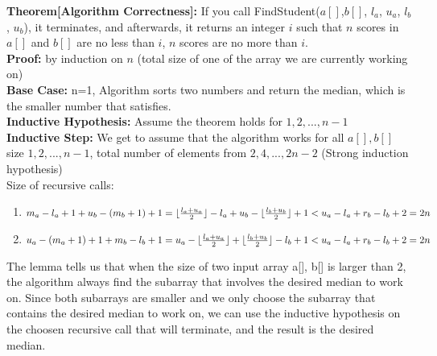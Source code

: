 \documentclass{article}
\begin{document}
\textbf{Theorem[Algorithm Correctness]:} If you call FindStudent($a[ ]$,$b[]$, $l_a$, $u_a$, $l_b$, $u_b$), it terminates, and afterwards, it returns an integer $i$ such that $n$ scores in $a[]$ and $b[]$ are no less than $i$, $n$ scores are no more than $i$.\\
\textbf{Proof:} by induction on $n$ (total size of one of the array we are currently working on)
\\\textbf{Base Case:} n=1, Algorithm sorts two numbers and return the median, which is the smaller number that satisfies.
\\\textbf{Inductive Hypothesis:} Assume the theorem holds for $1,2,...,n-1$
\\\textbf{Inductive Step:} We get to assume that the algorithm works for all $a[],b[]$ size $1,2,...,n-1$, total number of elements from $2,4,...,2n-2$ (Strong induction hypothesis)
\\Size of recursive calls:
\begin{enumerate}
    \item $m_a-l_a+1+u_b-(m_b+1)+1\\= \lfloor\frac{l_a+u_a}{2}\rfloor-l_a+u_b-\lfloor\frac{l_b+u_b}{2}\rfloor+1 < u_a-l_a+r_b-l_b+2=2n$
    \item $u_a-(m_a+1)+1+m_b-l_b+1\\= u_a-\lfloor\frac{l_a+u_a}{2}\rfloor+\lfloor\frac{l_b+u_b}{2}\rfloor-l_b+1 < u_a-l_a+r_b-l_b+2=2n$
\end{enumerate}

The lemma tells us that when the size of two input array a[], b[] is larger than 2, the algorithm always find the subarray that involves the desired median to work on. Since both subarrays are smaller and we only choose the subarray that contains the desired median to work on, we can use the inductive hypothesis on the choosen recursive call that will terminate, and the result is the desired median.
\end{document}
